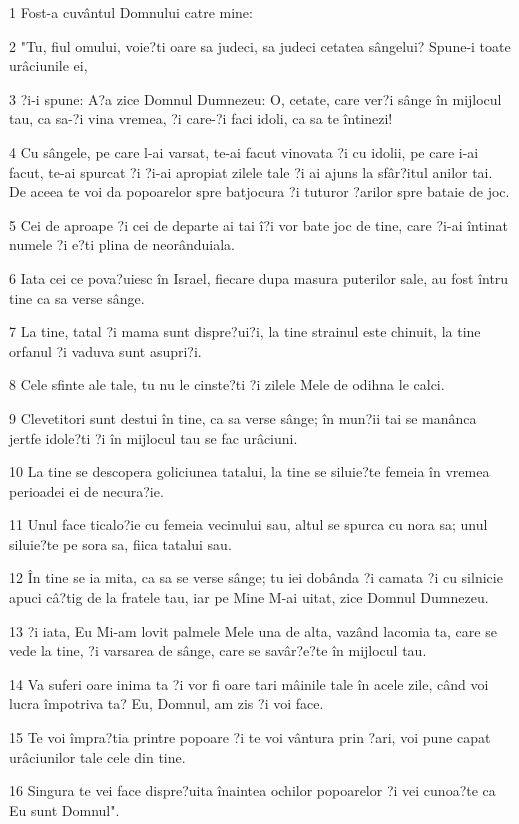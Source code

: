 \par 1 Fost-a cuvântul Domnului catre mine:
\par 2 "Tu, fiul omului, voie?ti oare sa judeci, sa judeci cetatea sângelui? Spune-i toate urâciunile ei,
\par 3 ?i-i spune: A?a zice Domnul Dumnezeu: O, cetate, care ver?i sânge în mijlocul tau, ca sa-?i vina vremea, ?i care-?i faci idoli, ca sa te întinezi!
\par 4 Cu sângele, pe care l-ai varsat, te-ai facut vinovata ?i cu idolii, pe care i-ai facut, te-ai spurcat ?i ?i-ai apropiat zilele tale ?i ai ajuns la sfâr?itul anilor tai. De aceea te voi da popoarelor spre batjocura ?i tuturor ?arilor spre bataie de joc.
\par 5 Cei de aproape ?i cei de departe ai tai î?i vor bate joc de tine, care ?i-ai întinat numele ?i e?ti plina de neorânduiala.
\par 6 Iata cei ce pova?uiesc în Israel, fiecare dupa masura puterilor sale, au fost întru tine ca sa verse sânge.
\par 7 La tine, tatal ?i mama sunt dispre?ui?i, la tine strainul este chinuit, la tine orfanul ?i vaduva sunt asupri?i.
\par 8 Cele sfinte ale tale, tu nu le cinste?ti ?i zilele Mele de odihna le calci.
\par 9 Clevetitori sunt destui în tine, ca sa verse sânge; în mun?ii tai se manânca jertfe idole?ti ?i în mijlocul tau se fac urâciuni.
\par 10 La tine se descopera goliciunea tatalui, la tine se siluie?te femeia în vremea perioadei ei de necura?ie.
\par 11 Unul face ticalo?ie cu femeia vecinului sau, altul se spurca cu nora sa; unul siluie?te pe sora sa, fiica tatalui sau.
\par 12 În tine se ia mita, ca sa se verse sânge; tu iei dobânda ?i camata ?i cu silnicie apuci câ?tig de la fratele tau, iar pe Mine M-ai uitat, zice Domnul Dumnezeu.
\par 13 ?i iata, Eu Mi-am lovit palmele Mele una de alta, vazând lacomia ta, care se vede la tine, ?i varsarea de sânge, care se savâr?e?te în mijlocul tau.
\par 14 Va suferi oare inima ta ?i vor fi oare tari mâinile tale în acele zile, când voi lucra împotriva ta? Eu, Domnul, am zis ?i voi face.
\par 15 Te voi împra?tia printre popoare ?i te voi vântura prin ?ari, voi pune capat urâciunilor tale cele din tine.
\par 16 Singura te vei face dispre?uita înaintea ochilor popoarelor ?i vei cunoa?te ca Eu sunt Domnul".
